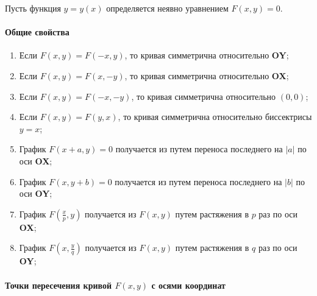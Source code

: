 			Пусть функция $y = y \left( x \right)$ определяется неявно уравнением $F \left( x, y \right) = 0$.\\

			\paragraph{Общие свойства}

				\begin{enumerate}
					\item Если $F \left( x, y \right) = F \left( - x, y \right)$, то кривая симметрична относительно \textbf{OY};

					\item Если $F \left( x, y \right) = F \left( x, - y \right)$, то кривая симметрична относительно \textbf{OX};

					\item Если $F \left( x, y \right) = F \left( - x, - y \right)$, то кривая симметрична относительно $\left( 0, 0 \right)$;

					\item Если $F \left( x, y \right) = F \left( y, x \right)$, то кривая симметрична относительно биссектрисы $y = x$;

					\item График $F \left( x + a, y \right) = 0$ получается из  путем переноса последнего на $\left| a \right|$ по оси \textbf{OX};

					\item График $F \left( x, y  + b \right) = 0$ получается из  путем переноса последнего на $\left| b \right|$ по оси \textbf{OY};
	
					\item График $F \left( \frac{x}{p}, y \right)$ получается из $F \left( x, y \right)$  путем растяжения в $p$ раз по оси \textbf{OX};

					\item График $F \left( x, \frac{y}{q} \right)$ получается из $F \left( x, y \right)$  путем растяжения в $q$ раз по оси \textbf{OY};
				\end{enumerate}

			\paragraph{Точки пересечения кривой $F \left( x, y \right)$ с осями координат}

